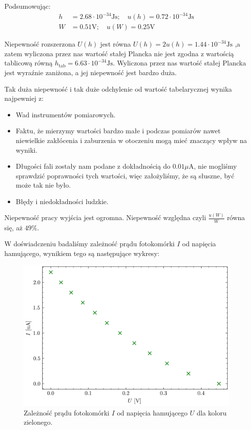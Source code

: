 \documentclass{fizykalab}
\newcommand{\volt}{\ensuremath{\text{V}}}
\newcommand{\Js}{\ensuremath{\text{Js}}}
\begin{document}
Podsumowując:
\begin{align*}
    h &= 2.68 \cdot 10^{-34} \Js; \quad    u(h)  = 0.72 \cdot 10^{-34} \Js \\
    W &= 0.51 \volt; \quad u(W)  = 0.25 \volt
\end{align*}

Niepewność rozszerzona $U(h)$ jest równa
$U(h) = 2 u(h) = 1.44 \cdot 10^{-34} \Js$
,a zatem wyliczona przez nas wartość stałej 
Plancka nie jest zgodna z wartością tablicową
równą $h_\text{tab} = 6.63 \cdot 10^{-34} \Js$.
Wyliczona przez nas wartość stałej Plancka jest wyraźnie
zaniżona, a jej niepewność jest bardzo duża.

Tak duża niepewność i tak duże odchylenie od wartość 
tabelarycznej wynika najpewniej z:
\begin{itemize}
    \item Wad instrumentów pomiarowych.
    \item Faktu, że mierzymy wartości bardzo małe i
    podczas pomiarów nawet niewielkie
    zakłócenia i zaburzenia w otoczeniu 
    mogą mieć znaczący wpływ na 
    wyniki.
    \item Długości fali zostały nam podane z
    dokładnością do $0.01 \mu \text{A}$,
    nie mogliśmy sprawdzić poprawności 
    tych wartości, więc założyliśmy, że są
    słuszne, być może tak nie było.
    \item Błędy i niedokładności ludzkie.



    
\end{itemize}

Niepewność pracy wyjścia jest 
ogromna. Niepewność względna 
czyli $\frac{u(W)}{W}$ równa się, aż $49\%$.

W doświadczeniu badaliśmy zależność prądu 
fotokomórki $I$ od napięcia hamującego, 
wynikiem tego są następujące wykresy:





\begin{figure}[H]
    \centering
    \includegraphics[width=0.75\linewidth]{green.png}
    \caption{
    Zależność prądu fotokomórki $I$ od napięcia hamującego $U$
    dla koloru zielonego.}
\end{figure}
\end{document}
